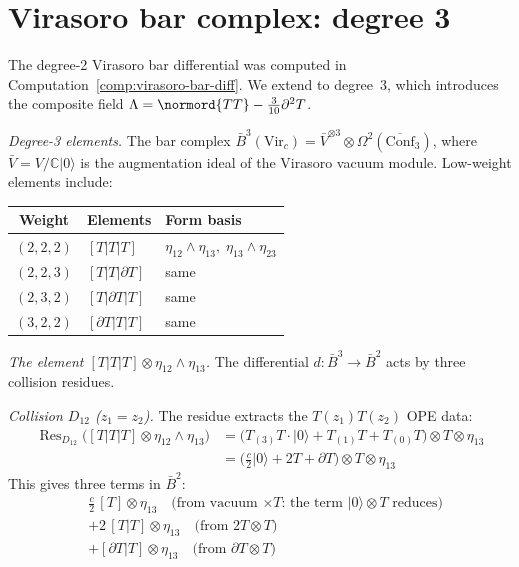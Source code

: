 \section{Virasoro bar complex: degree 3}
\label{sec:virasoro-degree3-details}

The degree-2 Virasoro bar differential was computed in
Computation~\ref{comp:virasoro-bar-diff}.  We extend to degree~3,
which introduces the composite field $\Lambda = \normord{TT} -
\frac{3}{10}\partial^2 T$.

\begin{computation}
\label{comp:virasoro-degree3}

\emph{Degree-3 elements.}
The bar complex $\bar{B}^3(\mathrm{Vir}_c) = \bar{V}^{\otimes 3}
\otimes \Omega^2(\overline{\mathrm{Conf}}_3)$, where
$\bar{V} = V/\mathbb{C}|0\rangle$ is the augmentation ideal
of the Virasoro vacuum module.  Low-weight elements include:
\begin{center}
\renewcommand{\arraystretch}{1.2}
\begin{tabular}{cll}
\textbf{Weight} & \textbf{Elements} & \textbf{Form basis} \\
\hline
$(2,2,2)$ & $[T|T|T]$ & $\eta_{12}\wedge\eta_{13},\;\eta_{13}\wedge\eta_{23}$ \\
$(2,2,3)$ & $[T|T|\partial T]$ & same \\
$(2,3,2)$ & $[T|\partial T|T]$ & same \\
$(3,2,2)$ & $[\partial T|T|T]$ & same
\end{tabular}
\end{center}

\emph{The element $[T|T|T] \otimes \eta_{12}\wedge\eta_{13}$.}
The differential $d\colon \bar{B}^3 \to \bar{B}^2$ acts by three
collision residues.

\emph{Collision $D_{12}$ ($z_1 = z_2$).}
The residue extracts the $T(z_1)T(z_2)$ OPE data:
\begin{align*}
\operatorname{Res}_{D_{12}}\bigl([T|T|T] \otimes \eta_{12}\wedge\eta_{13}\bigr)
&= \bigl(T_{(3)}T \cdot |0\rangle + T_{(1)}T + T_{(0)}T\bigr) \otimes T
\otimes \eta_{13} \\
&= \bigl(\tfrac{c}{2}|0\rangle + 2T + \partial T\bigr)
\otimes T \otimes \eta_{13}
\end{align*}
This gives three terms in $\bar{B}^2$:
\begin{align*}
&\frac{c}{2}\,[T] \otimes \eta_{13}
\quad\text{(from vacuum $\times T$: the term $|0\rangle \otimes T$ reduces)} \\
&+ 2\,[T|T] \otimes \eta_{13}
\quad\text{(from $2T \otimes T$)} \\
&+ [\partial T|T] \otimes \eta_{13}
\quad\text{(from $\partial T \otimes T$)}
\end{align*}


\end{computation}
